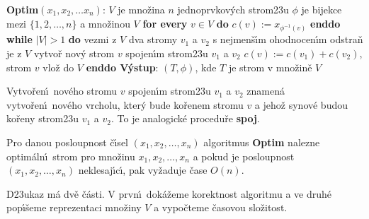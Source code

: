 \documentclass[a4paper,12pt]{article}
\begin{document}
{\bf Optim$(x_1,x_2,\dots x_n)$}:\newline 
$V$ je mno\v zina $n$ jednoprvkov\'ych strom\accent23u\newline 
$\phi$ je bijekce mezi $\{1,2,\dots,n\}$ a mno\v zinou $V$\newline 
{\bf for every} $v\in V$ {\bf do} $c(v):=x_{\phi^{-1}(v)}$ {\bf enddo\newline 
while} $|V|>1$ {\bf do\newline 
\phantom{{\rm---}}}vezmi z $V$ dva stromy $v_1$ a $v_2$ s nejmen\v s\'\i m ohodnocen\'\i m\newline 
\phantom{---}odstra\v n je z $V$\newline 
\phantom{---}vytvo\v r nov\'y strom $v$ spojen\'\i m strom\accent23u $
v_1$ a $v_2$\newline 
\phantom{---}$c(v):=c(v_1)+c(v_2)$, strom $v$ vlo\v z do $V$\newline 
{\bf enddo\newline 
V\'ystup}: $(T,\phi )$, kde $T$ je strom v mno\v zin\v e $V$
\bigskip

\flushpar Vytvo\v ren\'\i\ nov\'eho stromu $v$ spojen\'\i m strom\accent23u 
$v_1$ a $v_2$ znamen\'a vytvo\v ren\'\i\ nov\'eho vrcholu, kter\'y bude 
ko\v renem stromu $v$ a jeho\v z synov\'e budou ko\v reny strom\accent23u 
$v_1$ a $v_2$. To je analogick\'e procedu\v re {\bf spoj}.
\medskip

Pro danou posloupnost \v c\'\i sel 
$(x_1,x_2,\dots,x_n)$ algoritmus {\bf Optim} nalezne optim\'aln\'\i\ strom 
pro mno\v zinu $x_1,x_2,\dots,x_n$ a pokud je posloupnost 
$(x_1,x_2,\dots,x_n)$ neklesaj\'\i c\'\i , pak vy\v za\-du\-je \v case 
$O(n)$.  
\endproclaim

D\accent23ukaz m\'a dv\v e \v c\'asti. V 
prvn\'\i\ dok\'a\v zeme korektnost algoritmu a ve druh\'e pop\'\i\v seme 
reprezentaci mno\v ziny $V$ a vypo\v cteme \v casovou slo\v zitost.
\medskip
\end{document}
